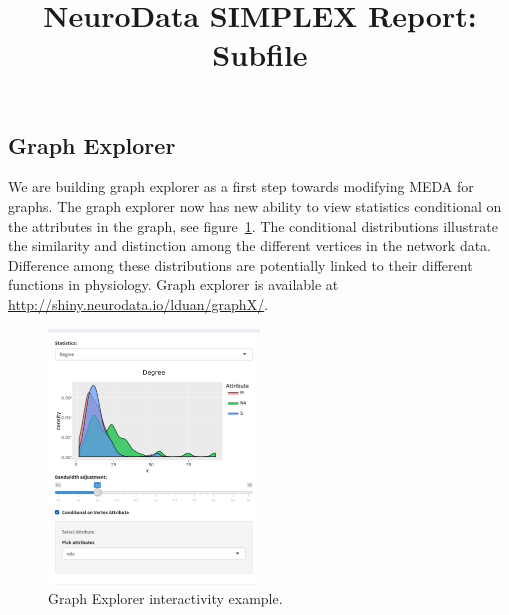 \documentclass[simplex.tex]{subfiles}
\title{NeuroData SIMPLEX Report: Subfile}
\begin{document}

\subsection{Graph Explorer}

We are building graph explorer as a first step towards modifying MEDA for graphs.  
The graph explorer now has new ability to view statistics conditional on the attributes in the graph, see figure~\ref{fig:graphExplorer}. The conditional distributions illustrate
the similarity and distinction among the different vertices in the
network data. Difference among these distributions are potentially
linked to their different functions in physiology.
Graph explorer is available at \url{http://shiny.neurodata.io/lduan/graphX/}.


\begin{figure}[h!]
\begin{cframed}
\centering
\includegraphics[width=0.5\textwidth]{../../figs/graph-explorer.png}
\caption{Graph Explorer interactivity example.}
\label{fig:graphExplorer}
\end{cframed}
\end{figure}
\end{document}
